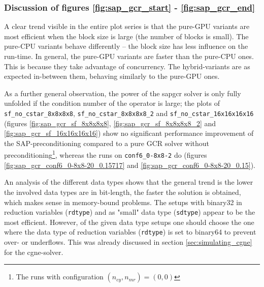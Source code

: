\documentclass{article}
\theoremstyle{plain} %
\theoremstyle{convention} %
\theoremstyle{remark} %
\def\code#1{\texttt{#1}}
\numberwithin{equation}{section}
\begin{document}
\subsubsection{Discussion of figures \ref{fig:sap_gcr_start} - \ref{fig:sap_gcr_end}}

A clear trend visible in the entire plot series is that the pure-GPU variants are most efficient when the block size is large (the number of blocks is small). The pure-CPU variants behave differently -- the block size has less influence on the run-time. In general, the pure-GPU variants are faster than the pure-CPU ones. This is because they take advantage of concurrency. The hybrid-variants are as expected in-between them, behaving similarly to the pure-GPU ones.

As a further general observation, the power of the \acrshort{sapgcr} solver is only fully unfolded if the condition number of the operator is large; the plots of \code{sf\_no\_cstar\_8x8x8x8}, \code{sf\_no\_cstar\_8x8x8x8\_2} and \code{sf\_no\_cstar\_16x16x16x16} (figures \ref{fig:sap_gcr_sf_8x8x8x8}, \ref{fig:sap_gcr_sf_8x8x8x8_2} and \ref{fig:sap_gcr_sf_16x16x16x16}) show no significant performance improvement of the SAP-preconditioning compared to a pure GCR solver without preconditioning\footnote{The runs with configuration $(n_{cy}, n_{mr}) = (0,0)$}, whereas the runs on \code{conf6\_0-8x8-2} do (figures \ref{fig:sap_gcr_conf6_0-8x8-20_0.15717} and \ref{fig:sap_gcr_conf6_0-8x8-20_0.15}).

An analysis of the different data types shows that the general trend is the lower the involved data types are in bit-length, the faster the solution is obtained, which makes sense in memory-bound problems. The setups with \gls{binary32} in reduction variables (\code{rdtype}) and as "small" data type (\code{sdtype}) appear to be the most efficient. However, of the given data type setups one should choose the one where the data type of reduction variables (\code{rdtype}) is set to \gls{binary64} to prevent over- or underflows. This was already discussed in section \ref{sec:simulating_cgne} for the \acrshort{cgne}-solver.
\end{document}
